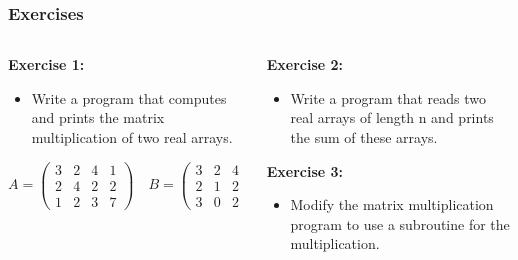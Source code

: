 \begin{frame}[fragile]
  \frametitle{Exercises}
  \begin{columns}[T]
    \begin{column}{0.5\textwidth}
      \textbf{Exercise 1:}
      \begin{itemize}
        \item Write a program that computes and prints the matrix multiplication of two real arrays.
      \end{itemize}
      \vspace*{0.2cm}
      \[
      A = \begin{pmatrix}
      3 & 2 & 4 & 1 \\
      2 & 4 & 2 & 2 \\
      1 & 2 & 3 & 7
      \end{pmatrix}
      \quad
      B = \begin{pmatrix}
      3 & 2 & 4 \\
      2 & 1 & 2 \\
      3 & 0 & 2
      \end{pmatrix}
      \]
    \end{column}

    \begin{column}{0.5\textwidth}
      \textbf{Exercise 2:}
      \begin{itemize}
        \item Write a program that reads two real arrays of length n and prints the sum of these arrays.
      \end{itemize}

      \textbf{Exercise 3:}
      \begin{itemize}
        \item Modify the matrix multiplication program to use a subroutine for the multiplication.
      \end{itemize}
    \end{column}
  \end{columns}
\end{frame}


